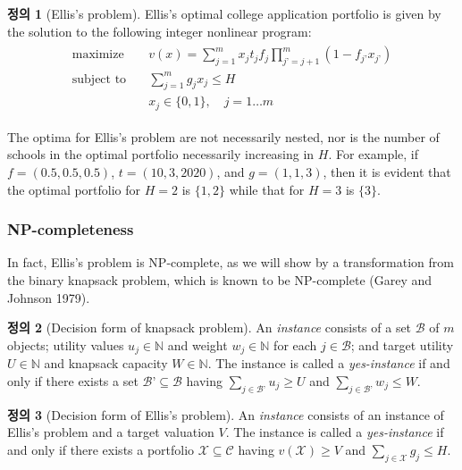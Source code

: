\documentclass[12pt]{article} %
\theoremstyle{definition}
\newtheorem{definition}{Definition}
\theoremstyle{definition}
\newtheorem{definition}{정의}
\begin{document}
\begin{definition}[Ellis's problem]
Ellis's optimal college application portfolio is given by the solution to the following integer nonlinear program:
\begin{align}
\begin{split}
\text{maximize}\quad & v(x) = \sum_{j=1}^m x_j t_j f_j \prod_{j’ = j+1}^m (1 - f_{j’} x_{j’}) \\
\text{subject to}\quad & \sum_{j=1}^m g_j x_j \leq H \\
&x_j \in \{0, 1\}, \quad j = 1\dots m
\end{split}
\end{align}
\end{definition}

The optima for Ellis's problem are not necessarily nested, nor is the number of schools in the optimal portfolio necessarily increasing in $H$. For example, if
$f = (0.5, 0.5, 0.5)$, $t = (10, 3, 2020)$, and $g = (1, 1, 3)$,
then it is evident that the optimal portfolio for $H = 2$ is $\{1, 2\}$ while that for $H = 3$ is $\{3\}$. 

\subsubsection{NP-completeness}
In fact, Ellis’s problem is NP-complete, as we will show by a transformation from the binary knapsack problem, which is known to be NP-complete (Garey and Johnson 1979).

\begin{definition}[Decision form of knapsack problem]
An \emph{instance} consists of a set $\mathcal{B}$ of $m$ objects; utility values $u_j \in \mathbb{N}$ and weight $w_j \in \mathbb{N}$ for each $j \in \mathcal{B}$; and target utility $U\in \mathbb{N}$ and knapsack capacity $W\in \mathbb{N}$. The instance is called a \emph{yes-instance} if and only if there exists a set $\mathcal{B’} \subseteq \mathcal{B}$ having $\sum_{j \in \mathcal{B’}} u_j \geq U$ and  $\sum_{j \in \mathcal{B’}} w_j \leq W$.
\end{definition}

\begin{definition}[Decision form of Ellis’s problem]
An \emph{instance} consists of an instance of Ellis’s problem and a target valuation $V$. The instance is called a \emph{yes-instance} if and only if there exists a portfolio $\mathcal{X} \subseteq \mathcal{C}$ having $v(\mathcal{X}) \geq V$ and  $\sum_{j \in \mathcal{X}} g_j \leq H$.
\end{definition}
\end{document}

